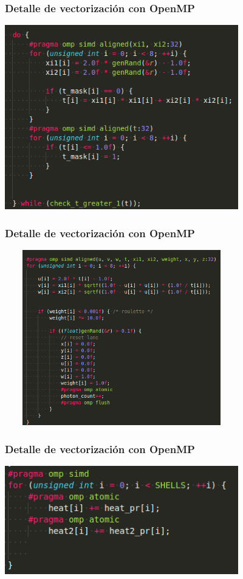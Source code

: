 \documentclass{beamer}
\begin{document}
    \begin{frame}
        \frametitle{Detalle de vectorización con OpenMP}
        \includegraphics[width=4in]{imagenes/omp_vec_5.png}

    \end{frame}

    \begin{frame}
        \frametitle{Detalle de vectorización con OpenMP}
        \includegraphics[width=4in, height=3in]{imagenes/omp_vec_6.png}

    \end{frame}

    \begin{frame}
        \frametitle{Detalle de vectorización con OpenMP}
        \includegraphics[width=4in]{imagenes/omp_vec_7.png}

    \end{frame}
\end{document}
